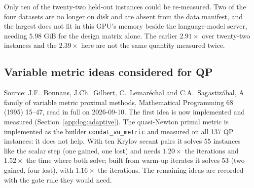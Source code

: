 Only ten of the twenty-two held-out instances could be re-measured. Two of the four
datasets are no longer on disk and are absent from the data manifest, and the largest
does not fit in this GPU's memory beside the language-model server, needing
$5.98$ GiB for the design matrix alone. The earlier $2.91\times$ over twenty-two
instances and the $2.39\times$ here are not the same quantity measured twice.

\subsection{Variable metric ideas considered for QP}
\label{app:log:varmetric}

Source: J.F.~Bonnans, J.Ch.~Gilbert, C.~Lemar\'echal and C.A.~Sagastiz\'abal, A
family of variable metric proximal methods, Mathematical Programming 68
(1995) 15--47, read in full on 2026-09-10. The first idea is now implemented and measured
(Section~\ref{app:log:adaptive}). The quasi-Newton primal metric is implemented as
the builder \texttt{condat\_vu\_metric} and measured on all 137 QP instances: it does not
help. With ten Krylov secant pairs it solves 55 instances like the scalar step (one
gained, one lost) and needs $1.20\times$ the iterations and $1.52\times$ the time where
both solve; built from warm-up iterates it solves 53 (two gained, four lost), with
$1.16\times$ the iterations. The remaining ideas are recorded with the gate rule they
would need.

